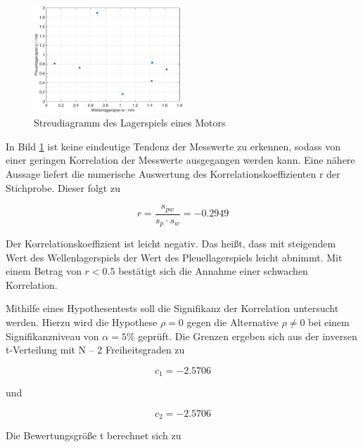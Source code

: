 \noindent 
\begin{figure}[H]
  \centerline{\includegraphics[width=0.5\textwidth]{Kapitel10/Bilder/image4}}
  \caption{Streudiagramm des Lagerspiels eines Motors}
  \label{fig:Lagerspiel}
\end{figure}

\noindent In Bild \ref{fig:Lagerspiel} ist keine eindeutige Tendenz der Messwerte zu erkennen, sodass von einer geringen Korrelation der Messwerte ausgegangen werden kann. Eine n\"{a}here Aussage liefert die numerische Auswertung des Korrelationskoeffizienten r der Stichprobe. Dieser folgt zu

\begin{equation}\label{eq:tensixty}
r=\dfrac{s_{pw}}{s_{p} \cdot s_{w}} =-0.2949
\end{equation}

\noindent Der Korrelationskoeffizient ist leicht negativ. Das hei{\ss}t, dass mit steigendem Wert des Wellenlagerspiels der Wert des Pleuellagerspiels leicht abnimmt. Mit einem Betrag von $r < 0.5$ best\"{a}tigt sich die Annahme einer schwachen Korrelation.\newline

\noindent Mithilfe eines Hypothesentests soll die Signifikanz der Korrelation untersucht werden. Hierzu wird die Hypothese $\rho = 0$ gegen die Alternative $\rho \neq 0$ bei einem Signifikanzniveau von $\alpha = 5 \%$ gepr\"{u}ft. Die Grenzen ergeben sich aus der inversen t-Verteilung mit N -- 2 Freiheitsgraden zu

\begin{equation}\label{eq:tensixtyone}
c_{1} =-2.5706
\end{equation}

\noindent und

\begin{equation}\label{eq:tensixtytwo}
c_{2} =-2.5706
\end{equation}

\noindent Die Bewertungsgr\"{o}{\ss}e t berechnet sich zu

